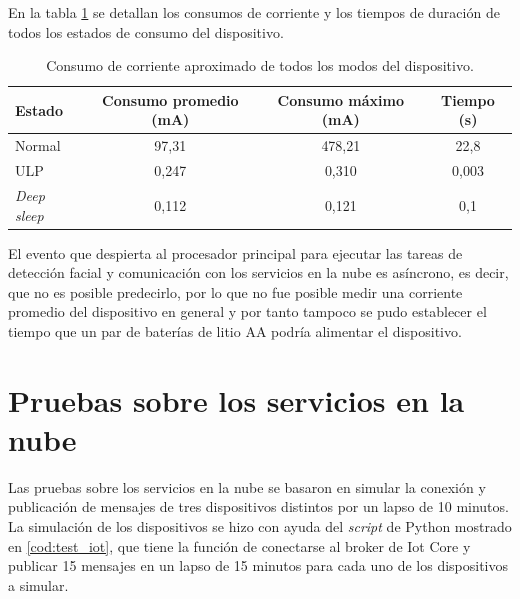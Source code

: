 En la tabla \ref{tab:test_ulp} se detallan los consumos de corriente y los tiempos de duración de todos los estados de consumo del dispositivo.

\begin{table}[h]
	\centering
	\caption[Consumo de corriente del dispositivo]{Consumo de corriente aproximado de todos los modos del dispositivo.}
	\begin{tabular}{lccc}   
		\toprule
		\textbf{Estado} & \textbf{Consumo promedio (mA)} & \textbf{Consumo máximo (mA)} & \textbf{Tiempo (s)} \\
		\midrule
		Normal & 97,31 & 478,21 & 22,8 \\
		ULP & 0,247 & 0,310 & 0,003 \\
		\textit{Deep sleep} & 0,112 & 0,121 & 0,1 \\
		\bottomrule
		\hline
	\end{tabular}
	\label{tab:test_ulp}
\end{table}

El evento que despierta al procesador principal para ejecutar las tareas de detección facial y comunicación con los servicios en la nube es asíncrono, es decir, que no es posible predecirlo, por lo que no fue posible medir una corriente promedio del dispositivo en general y por tanto tampoco se pudo establecer el tiempo que un par de baterías de litio AA podría alimentar el dispositivo.

\section{Pruebas sobre los servicios en la nube}
Las pruebas sobre los servicios en la nube se basaron en simular la conexión y publicación de mensajes de tres dispositivos distintos por un lapso de 10 minutos. La simulación de los dispositivos se hizo con ayuda del \textit{script} de Python mostrado en \ref{cod:test_iot}, que tiene la función de conectarse al broker de Iot Core y publicar 15 mensajes en un lapso de 15 minutos para cada uno de los dispositivos a simular.

